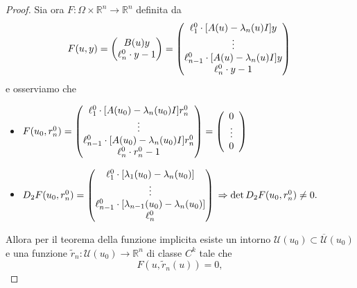 \begin{proof}
    Sia ora $F\colon\Omega\times\mathbb{R}^{n}\rightarrow\mathbb{R}^{n}$ definita da
    \begin{equation*}
        F(u,y) = \begin{pmatrix}B(u)y \\ \ell_{n}^{0}\cdot y-1\end{pmatrix}
        = \begin{pmatrix}\ell^{0}_{1}\cdot[A(u)-\lambda_{n}(u)I]y \\ \vdots \\ \ell^{0}_{n-1}\cdot[A(u)-\lambda_{n}(u)I]y\\ \ell_{n}^{0}\cdot y-1\end{pmatrix}\\
    \end{equation*}
    e osserviamo che 
    \begin{itemize}
        \item $F(u_{0},r^{0}_{n})=
        \begin{pmatrix}\ell^{0}_{1}\cdot[A(u_{0})-\lambda_{n}(u_{0})I]r^{0}_{n} \\ \vdots \\ \ell^{0}_{n-1}\cdot[A(u_{0})-\lambda_{n}(u_{0})I]r^{0}_{n}\\ \ell_{n}^{0}\cdot r^{0}_{n}-1\end{pmatrix} = \left(\begin{array}{c}0\\ \vdots\\0\end{array}\right)\\$
        \item$D_{2}F(u_{0},r_{n}^{0})=
        \begin{pmatrix}\ell^{0}_{1}\cdot[\lambda_{1}(u_{0})-\lambda_{n}(u_{0})] \\ \vdots \\ \ell^{0}_{n-1}\cdot[\lambda_{n-1}(u_{0})-\lambda_{n}(u_{0})]\\ \ell_{n}^{0}\end{pmatrix}\\
        \Rightarrow\det D_{2}F(u_{0},r^{0}_{n})\neq 0.$
    \end{itemize}
    Allora per il teorema della funzione implicita esiste un intorno $\mathcal{U}(u_{0})\subset\overline{\mathcal{U}}(u_{0})$ e una funzione $\widetilde{r}_{n}\colon\mathcal{U}(u_{0})\rightarrow\mathbb{R}^{n}$ di classe $C^{k}$ tale che
    \begin{equation*}
        F(u,\widetilde{r}_{n}(u)) = 0,
    \end{equation*}

\end{proof}

